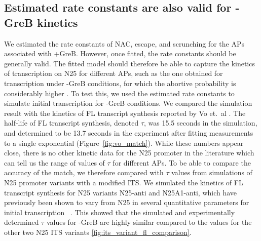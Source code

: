 \subsection{Estimated rate constants are also valid for -GreB kinetics}
We estimated the rate constants of NAC, escape, and scrunching for the
APs associated with +GreB. However, once fitted, the rate constants should
be generally valid. The fitted model should therefore be able to capture the
kinetics of transcription on N25 for different APs, such as the
one obtained for transcription under -GreB conditions, for which the abortive
probability is considerably higher \cite{hsu_initial_2006}. To test this, we
used the estimated rate constants to simulate initial transcription for
-GreB conditions. We compared the simulation result with the kinetics
of FL transcript synthesis reported by Vo et.\ al \cite{vo_vitro_2003-1}.
The half-life of FL transcript synthesis, denoted $\tau$, was 15.5 seconds in
the simulation, and determined to be 13.7 seconds in the experiment after
fitting measurements to a single exponential (Figure~\ref{fig:vo_match}).
While these numbers appear close, there is no other kinetic data for the N25
promoter in the literature which can tell us the range of values of $\tau$ for
different APs. To be able to compare the accuracy of the match,
we therefore compared with $\tau$ values from simulations of N25 promoter
variants with a modified ITS. We simulated the kinetics of FL transcript
synthesis for N25 variants N25-anti and N25A1-anti, which have previously been
shown to vary from N25 in several quantitative parameters for initial
transcription~
\cite{hsu_initial_2006,chan_anti-initial_2001,kammerer_functional_1986}. This
showed that the simulated and experimentally determined $\tau$ values for
-GreB are highly similar compared to the values for the other two N25 ITS
variants \ref{fig:its_variant_fl_comparison}.

